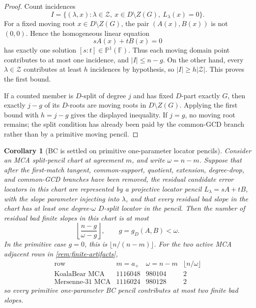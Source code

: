 \documentclass[a4paper,11pt]{amsart}
\newtheorem{corollary}[corollary]{Corollary}
\theoremstyle{remark}
\newcommand{\F}{\mathbb F}
\begin{document}
\begin{proof}
Count incidences
\[
        I=\{(\lambda,x):\lambda\in\mathcal Z,
        \ x\in D\setminus Z(G),\ L_\lambda(x)=0\}.
\]
For a fixed moving root \(x\in D\setminus Z(G)\), the pair \((A(x),B(x))\) is not \((0,0)\).  Hence the homogeneous linear equation
\[
        sA(x)+tB(x)=0
\]
has exactly one solution \([s:t]\in\mathbb P^1(\F)\).  Thus each moving domain point contributes to at most one incidence, and \(|I|\le n-g\).  On the other hand, every \(\lambda\in\mathcal Z\) contributes at least \(h\) incidences by hypothesis, so \(|I|\ge h|\mathcal Z|\).  This proves the first bound.

If a counted member is \(D\)-split of degree \(j\) and has fixed \(D\)-part exactly \(G\), then exactly \(j-g\) of its \(D\)-roots are moving roots in \(D\setminus Z(G)\).  Applying the first bound with \(h=j-g\) gives the displayed inequality.  If \(j=g\), no moving root remains; the split condition has already been paid by the common-GCD branch rather than by a primitive moving pencil.
\end{proof}

\begin{corollary}[BC is settled on primitive one-parameter locator pencils]\label{cor:bc-one-pencil}
Consider an MCA split-pencil chart at agreement \(m\), and write \(\omega=n-m\).  Suppose that after the first-match tangent, common-support, quotient, extension, degree-drop, and common-GCD branches have been removed, the residual candidate error locators in this chart are represented by a projective locator pencil \(L_\lambda=sA+tB\), with the slope parameter injecting into \(\lambda\), and that every residual bad slope in the chart has at least one degree-\(\omega\) \(D\)-split locator in the pencil.  Then the number of residual bad finite slopes in this chart is at most
\[
        \left\lfloor\frac{n-g}{\omega-g}\right\rfloor,
        \qquad g=g_D(A,B)<\omega .
\]
In the primitive case \(g=0\), this is \(\lfloor n/(n-m)\rfloor\).  For the two active MCA adjacent rows in \cref{rem:finite-artifacts},
\[
\begin{array}{c|c|c|c}
\text{row} & m=a_+ & \omega=n-m & \lfloor n/\omega\rfloor\\ \hline
\text{KoalaBear MCA} & 1116048 & 980104 & 2\\
\text{Mersenne-31 MCA} & 1116024 & 980128 & 2
\end{array}
\]
so every primitive one-parameter BC pencil contributes at most two finite bad slopes.
\end{corollary}
\end{document}
